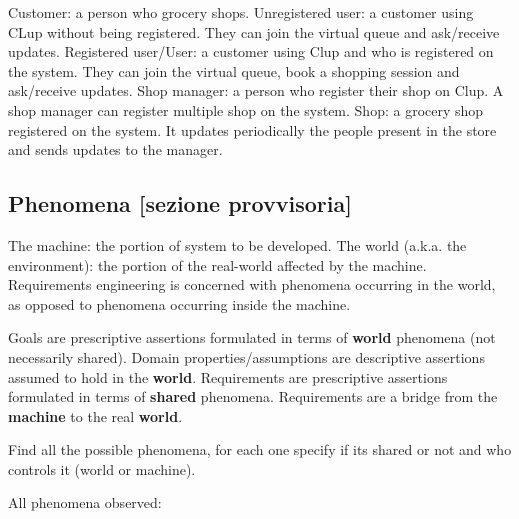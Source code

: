 Customer: a person who grocery shops.
Unregistered user: a customer using CLup without being registered. They can join the virtual queue and ask/receive updates.
Registered user/User: a customer using Clup and who is registered on the system. They can join the virtual queue, book a shopping session and ask/receive updates.
Shop manager: a person who register their shop on Clup. A shop manager can register multiple shop on the system.
Shop: a grocery shop registered on the system. It updates periodically the people present in the store and sends updates to the manager.

\subsection{Phenomena [sezione provvisoria]}
\label{subsect:phenomena}

The machine: the portion of system to be developed.
The world (a.k.a. the environment): the portion of the real-world affected by the machine.
Requirements engineering is concerned with phenomena occurring in the world, as opposed to phenomena occurring inside the machine.

Goals are prescriptive assertions formulated in terms of \textbf{world} phenomena (not necessarily shared).
Domain properties/assumptions are descriptive assertions assumed to hold in the \textbf{world}.
Requirements are prescriptive assertions formulated in terms of \textbf{shared} phenomena.
Requirements are a bridge from the \textbf{machine} to the real \textbf{world}.

Find all the possible phenomena, for each one specify if its shared or not and who controls it (world or machine). 

All phenomena observed:

